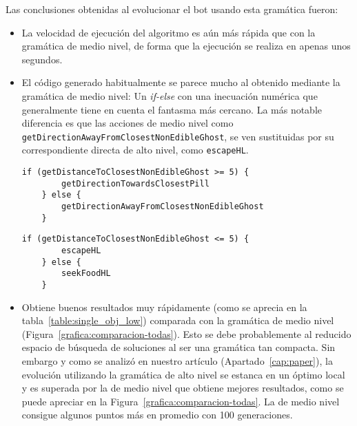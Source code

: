 Las conclusiones obtenidas al evolucionar el bot usando esta gramática fueron:
\begin{itemize}
\item La velocidad de ejecución del algoritmo es aún más rápida que con la gramática de medio nivel, de forma que la ejecución se realiza en apenas unos segundos.

\item El código generado habitualmente se parece mucho al obtenido mediante la gramática de medio nivel: Un \textit{if-else} con una inecuación numérica que generalmente tiene en cuenta el fantasma más cercano. La más notable diferencia es que las acciones de medio nivel como \texttt{getDirectionAwayFromClosestNonEdibleGhost}, se ven sustituidas por su correspondiente directa de alto nivel, como \texttt{escapeHL}.
\begin{lstlisting}[caption={Código del mejor individuo obtenido en una población evolucionada con la gramática de medio nivel.}]
    if (getDistanceToClosestNonEdibleGhost >= 5) {
        getDirectionTowardsClosestPill
    } else {
        getDirectionAwayFromClosestNonEdibleGhost
    }
\end{lstlisting}

\begin{lstlisting}[caption={Código del mejor individuo obtenido en una población evolucionada con la gramática de alto nivel.}]
    if (getDistanceToClosestNonEdibleGhost <= 5) {
        escapeHL
    } else {
        seekFoodHL
    }
\end{lstlisting}

\item Obtiene buenos resultados muy rápidamente (como se aprecia en la tabla~\ref{table:single_obj_low}) comparada con la gramática de medio nivel (Figura~\ref{grafica:comparacion-todas}). Esto se debe probablemente al reducido espacio de búsqueda de soluciones al ser una gramática tan compacta. Sin embargo y como se analizó en nuestro artículo (Apartado~\ref{cap:paper}),  la evolución utilizando la gramática de alto nivel se estanca en un óptimo local y es superada por la de medio nivel que obtiene mejores resultados, como se puede apreciar en la Figura~\ref{grafica:comparacion-todas}. La de medio nivel consigue algunos puntos más en promedio con 100 generaciones.
\end{itemize}

